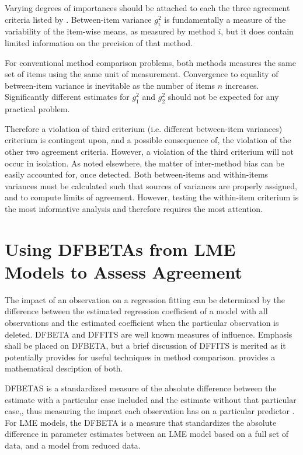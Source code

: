 \documentclass[12pt, a4paper]{report}
\theoremstyle{plain}
\theoremstyle{definition}
\theoremstyle{remark}
\begin{document}
Varying degrees of importances should be attached to each the three agreement criteria listed by \citet{Barnhart}. Between-item variance $g^2_i$ is fundamentally a measure of the variability of the item-wise means, as measured by method $i$, but it does contain limited information on the precision of that method. 

For conventional method comparison problems, both methods measures the same set of items using the same unit of measurement. Convergence to equality of between-item variance is inevitable as the number of items $n$ increases. Significantly different estimates for $g^2_1$ and $g^2_2$ should not be expected for any practical problem. 

Therefore a violation of third criterium (i.e. different between-item variances) criterium is contingent upon, and a  
possible consequence of, the violation of the other two agreement criteria. However, a violation of the third criterium will not occur in isolation. As noted elsewhere, the matter of inter-method bias can be easily accounted for, once detected. Both between-items and within-items variances must be calculated such that sources of variances are properly assigned, and to compute limits of agreement. However, testing the within-item criterium is the most informative analysis and therefore requires the most attention. 





	
\section{Using DFBETAs from LME Models to Assess Agreement}

The impact of an observation on a regression fitting can be determined by the difference between the estimated regression coefficient of a model with all observations and the estimated coefficient when the particular observation is deleted. DFBETA and DFFITS are well known measures of influence. Emphasis shall be placed on DFBETA, but a brief discussion of DFFITS is merited as it potentially provides for useful techniques in method comparison. \citet{schabenberger} provides a mathematical desciption of both.

DFBETAS is a standardized measure of the absolute difference between the estimate with a particular
case included and the estimate without that particular case,, thus measuring the impact each observation has on a particular predictor \citep{belsley2005}. For LME models, the DFBETA is a measure that standardizes the absolute difference in parameter estimates between an LME model based on a full set of data, and a model from reduced data.
\end{document}
